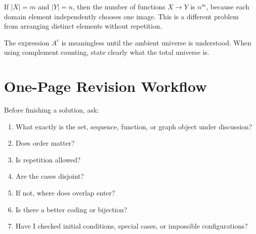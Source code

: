 \documentclass[12pt]{article}
\begin{document}
\begin{commonmistake}[title={Counting functions as though they were permutations}]
If $|X|=m$ and $|Y|=n$, then the number of functions $X\to Y$ is $n^m$, because each domain element independently chooses one image. This is a different problem from arranging distinct elements without repetition.
\end{commonmistake}

\begin{commonmistake}[title={Using complements without fixing the universe}]
The expression $A^c$ is meaningless until the ambient universe is understood. When using complement counting, state clearly what the total universe is.
\end{commonmistake}

\section{One-Page Revision Workflow}

\begin{policynote}[title={A compact working checklist}]
Before finishing a solution, ask:
\begin{enumerate}[leftmargin=*]
    \item What exactly is the set, sequence, function, or graph object under discussion?
    \item Does order matter?
    \item Is repetition allowed?
    \item Are the cases disjoint?
    \item If not, where does overlap enter?
    \item Is there a better coding or bijection?
    \item Have I checked initial conditions, special cases, or impossible configurations?
\end{enumerate}
\end{policynote}
\end{document}
